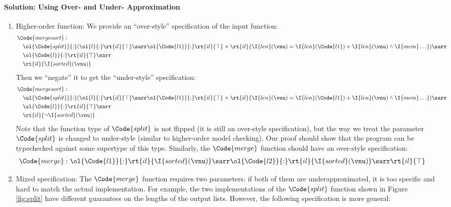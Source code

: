 \paragraph{Solution: Using Over- and Under- Approximation}
\begin{enumerate}
    \item Higher-order function: We provide an ``over-style'' specification of the input function:
    \begin{align*}
        &\Code{mergesort}:
        \\&\quad \ol{\Code{split}}{:}(\ol{l}{:}\rt{il}{\top} \sarr \ol{\Code{l1}}{:}\rt{il}{\top} \times \rt{il}{\I{len}(\vnu) = \I{len}(\Code{l1}) + \I{len}(\vnu) \land \I{mem}\ldots}) \sarr
        \\&\quad \ol{\Code{l}}{:}\rt{il}{\top} \sarr
        \\&\quad \rt{il}{\I{sorted}(\vnu)}
    \end{align*}\noindent
    Then we ``negate'' it to get the ``under-style'' specification:
    \begin{align*}
        &\Code{mergesort}:
        \\&\quad \ul{\Code{split}}{:}(\ol{l}{:}\rt{il}{\top} \sarr \ol{\Code{l1}}{:}\rt{il}{\top} \times \rt{il}{\I{len}(\vnu) = \I{len}(\Code{l1}) + \I{len}(\vnu) \land \I{mem}\ldots}) \sarr
        \\&\quad \ul{\Code{l}}{:}\rt{il}{\top} \sarr
        \\&\quad \rt{il}{\neg \I{sorted}(\vnu)}
    \end{align*}\noindent
    Note that the function type of $\Code{split}$ is not flipped (it is still an over-style specification), but the way we treat the parameter $\Code{split}$ is changed to under-style (similar to higher-order model checking). Our proof should show that the program can be typechecked against some supertype of this type. Similarly, the $\Code{merge}$ function should have an over-style specification:
    \begin{align*}
        &\Code{merge}: \ol{\Code{l1}}{:}\rt{il}{\I{sorted}(\vnu)} \sarr \ol{\Code{l2}}{:}\rt{il}{\I{sorted}(\vnu)} \sarr \rt{il}{\top}
    \end{align*}\noindent
    \item Mixed specification: The $\Code{merge}$ function requires two parameters; if both of them are underapproximated, it is too specific and hard to match the actual implementation. For example, the two implementations of the $\Code{split}$ function shown in Figure \ref{fig:split} have different guarantees on the lengths of the output lists. However, the following specification is more general:

\end{enumerate}
